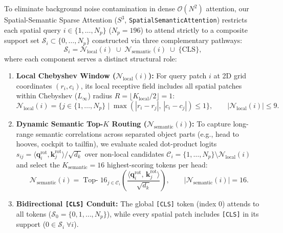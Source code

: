 \documentclass[11pt,a4paper]{article}
\begin{document}
To eliminate background noise contamination in dense $\mathcal{O}(N^2)$ attention, our Spatial-Semantic Sparse Attention ($S^3$, \texttt{SpatialSemanticAttention}) restricts each spatial query $i \in \{1, \dots, N_p\}$ ($N_p = 196$) to attend strictly to a composite support set $\mathcal{S}_i \subset \{0, \dots, N_p\}$ constructed via three complementary pathways:
\begin{equation}
\mathcal{S}_i = \mathcal{N}_{\text{local}}(i) \;\cup\; \mathcal{N}_{\text{semantic}}(i) \;\cup\; \{\text{CLS}\},
\label{eq:s3_support_union}
\end{equation}
where each component serves a distinct structural role:
\begin{enumerate}[leftmargin=*]
    \item \textbf{Local Chebyshev Window ($\mathcal{N}_{\text{local}}(i)$):} For query patch $i$ at 2D grid coordinates $(r_i, c_i)$, its local receptive field includes all spatial patches within Chebyshev ($L_\infty$) radius $R = \lfloor K_{\text{local}} / 2 \rfloor = 1$:
    \begin{equation}
    \mathcal{N}_{\text{local}}(i) = \big\{j \in \{1, \dots, N_p\} \;\big|\; \max(|r_i - r_j|, \, |c_i - c_j|) \le 1\big\}, \qquad |\mathcal{N}_{\text{local}}(i)| \le 9.
    \label{eq:chebyshev_window}
    \end{equation}
    \item \textbf{Dynamic Semantic Top-$K$ Routing ($\mathcal{N}_{\text{semantic}}(i)$):} To capture long-range semantic correlations across separated object parts (e.g., head to hooves, cockpit to tailfin), we evaluate scaled dot-product logits $s_{ij} = \langle \mathbf{q}_i^{\text{rot}}, \mathbf{k}_j^{\text{rot}} \rangle / \sqrt{d_k}$ over non-local candidates $\mathcal{C}_i = \{1, \dots, N_p\} \setminus \mathcal{N}_{\text{local}}(i)$ and select the $K_{\text{semantic}} = 16$ highest-scoring tokens per head:
    \begin{equation}
    \mathcal{N}_{\text{semantic}}(i) = \operatorname{Top-}16_{j \in \mathcal{C}_i}\!\left(\frac{\langle \mathbf{q}_i^{\text{rot}}, \, \mathbf{k}_j^{\text{rot}} \rangle}{\sqrt{d_k}}\right), \qquad |\mathcal{N}_{\text{semantic}}(i)| = 16.
    \label{eq:topk_selection}
    \end{equation}
    \item \textbf{Bidirectional \texttt{[CLS]} Conduit:} The global \texttt{[CLS]} token (index 0) attends to all tokens ($\mathcal{S}_0 = \{0, 1, \dots, N_p\}$), while every spatial patch includes \texttt{[CLS]} in its support ($0 \in \mathcal{S}_i \;\forall i$).
\end{enumerate}
\end{document}
